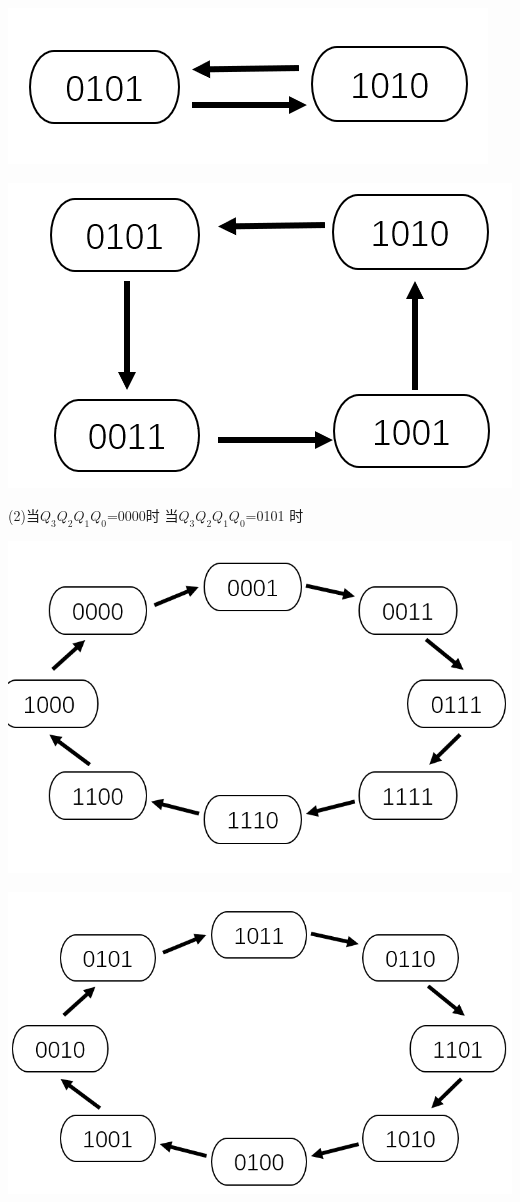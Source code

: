 \documentclass{ctexart}
\begin{document}
    
    \begin{minipage}[c]{0.5\textwidth}
        \centering
        \includegraphics[width=0.8\linewidth]{3.1.3.png} 
    \end{minipage}
    \begin{minipage}[c]{0.45\textwidth}
        \centering
        \includegraphics[width=0.8\linewidth]{3.1.4.png} 
    \end{minipage}
    \newpage
    (2)\qquad \quad \qquad  当$Q_3Q_2Q_1Q_0$=0000时     \qquad \qquad \qquad \qquad\qquad 当$Q_3Q_2Q_1Q_0$=0101 时
    
    \begin{minipage}[c]{0.5\textwidth}
        \centering
        \includegraphics[width=0.78\linewidth]{3.1.5.png} 
    \end{minipage}
    \begin{minipage}[c]{0.45\textwidth}
        \centering
        \includegraphics[width=0.8\linewidth]{3.1.6.png} 
    \end{minipage}
\end{document}

